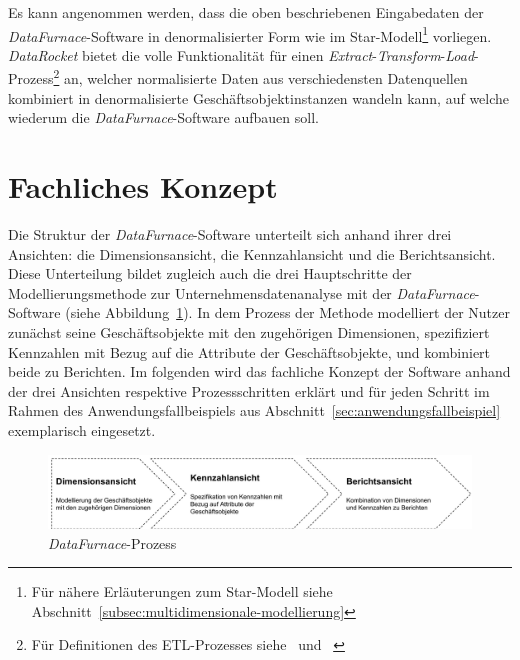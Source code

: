 \documentclass[
  language=german, %
  type=bachelor,%
  ngerman
]{isthesis}
\begin{document}
\begin{content}
\begin{enumerate}
			Es kann angenommen werden, dass die oben beschriebenen Eingabedaten der
			\textit{DataFurnace}-Software in denormalisierter Form wie im
			Star-Modell\footnote{Für nähere Erläuterungen zum Star-Modell siehe
			Abschnitt~\ref{subsec:multidimensionale-modellierung}} vorliegen.
			\textit{DataRocket} bietet die volle Funktionalität für einen
			\textit{Extract}-\textit{Transform}-\textit{Load}-Prozess\footnote{Für
			Definitionen des ETL-Prozesses
			siehe~\textsc{\citeauthor{vassiliadis2002conceptual}}
			\citeyearpar{vassiliadis2002conceptual}
			und~\textsc{\citeauthor{trujillo2003uml}} \citeyearpar{trujillo2003uml}}
			an, welcher normalisierte Daten aus verschiedensten Datenquellen
			kombiniert in denormalisierte Geschäftsobjektinstanzen wandeln kann, auf
			welche wiederum die \textit{DataFurnace}-Software aufbauen soll.

  \end{enumerate}



  \section{Fachliches Konzept}

  Die Struktur der \textit{DataFurnace}-Software unterteilt sich anhand ihrer
  drei Ansichten: die Dimensionsansicht, die Kennzahlansicht und die
  Berichtsansicht. Diese Unterteilung bildet zugleich auch die drei
  Hauptschritte der Modellierungsmethode zur Unternehmensdatenanalyse mit der
  \textit{DataFurnace}-Software (siehe Abbildung~\ref{datafurnace-prozess}). In
  dem Prozess der Methode modelliert der Nutzer zunächst seine Geschäftsobjekte
  mit den zugehörigen Dimensionen, spezifiziert Kennzahlen mit Bezug auf die
  Attribute der Geschäftsobjekte, und kombiniert beide zu Berichten. Im
  folgenden wird das fachliche Konzept der Software anhand der drei Ansichten
  respektive Prozessschritten erklärt und für jeden Schritt im Rahmen des
  Anwendungsfallbeispiels aus Abschnitt~\ref{sec:anwendungsfallbeispiel}
  exemplarisch eingesetzt.

  \begin{figure}
    \includegraphics[scale=0.60]{content/figures/datafurnace-process}
    \caption{\textit{DataFurnace}-Prozess}\label{datafurnace-prozess}
  \end{figure}


\end{content}
\end{document}
